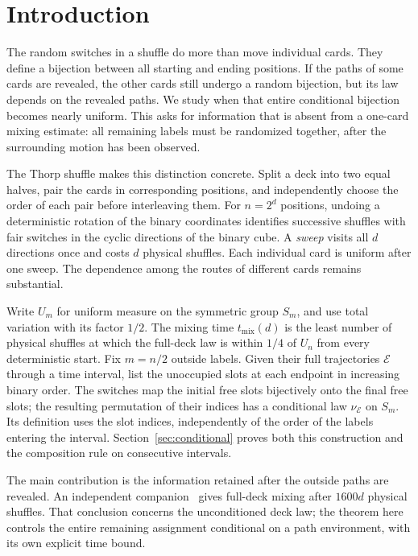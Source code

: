 \section{Introduction}

The random switches in a shuffle do more than move individual cards. They define a bijection between all starting and ending positions. If the paths of some cards are revealed, the other cards still undergo a random bijection, but its law depends on the revealed paths. We study when that entire conditional bijection becomes nearly uniform. This asks for information that is absent from a one-card mixing estimate: all remaining labels must be randomized together, after the surrounding motion has been observed.

The Thorp shuffle makes this distinction concrete. Split a deck into two equal halves, pair the cards in corresponding positions, and independently choose the order of each pair before interleaving them. For $n=2^d$ positions, undoing a deterministic rotation of the binary coordinates identifies successive shuffles with fair switches in the cyclic directions of the binary cube. A \emph{sweep} visits all $d$ directions once and costs $d$ physical shuffles. Each individual card is uniform after one sweep. The dependence among the routes of different cards remains substantial.

Write $U_m$ for uniform measure on the symmetric group $S_m$, and use total variation with its factor $1/2$. The mixing time $t_{\mathrm{mix}}(d)$ is the least number of physical shuffles at which the full-deck law is within $1/4$ of $U_n$ from every deterministic start. Fix $m=n/2$ outside labels. Given their full trajectories $\mathcal E$ through a time interval, list the unoccupied slots at each endpoint in increasing binary order. The switches map the initial free slots bijectively onto the final free slots; the resulting permutation of their indices has a conditional law $\nu_{\mathcal E}$ on $S_m$. Its definition uses the slot indices, independently of the order of the labels entering the interval. Section~\ref{sec:conditional} proves both this construction and the composition rule on consecutive intervals.

The main contribution is the information retained after the outside paths are revealed. An independent companion~\cite{optimal-order} gives full-deck mixing after $1600d$ physical shuffles. That conclusion concerns the unconditioned deck law; the theorem here controls the entire remaining assignment conditional on a path environment, with its own explicit time bound.


